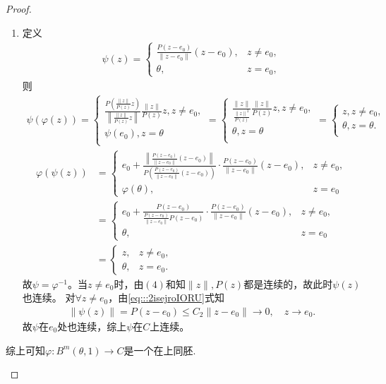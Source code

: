 \documentclass[../../main.tex]{subfiles}%
\begin{document}
\begin{proof}
\begin{enumerate}[(1)]
\begin{enumerate}[(1)]
\item 定义\begin{align*}
\psi(z)=
\begin{cases}
\frac{P(z-e_0)}{\|z-e_0\|}(z-e_0),&z\ne e_0,\\
\theta,&z=e_0,
\end{cases}
\end{align*}
则\begin{align*}
\psi \left( \varphi \left( z \right) \right) =\begin{cases}
\frac{P\left( \frac{\left\| z \right\|}{P\left( z \right)}z \right)}{\left\| \frac{\left\| z \right\|}{P\left( z \right)}z \right\|}\frac{\left\| z \right\|}{P\left( z \right)}z,z\ne e_0,\\
\psi \left( e_0 \right) ,z=\theta\\
\end{cases}=\begin{cases}
\frac{\left\| z \right\|}{\frac{\left\| z \right\| ^2}{P\left( z \right)}}\frac{\left\| z \right\|}{P\left( z \right)}z,z\ne e_0,\\
\theta ,z=\theta\\
\end{cases}=\begin{cases}
z,z\ne e_0,\\
\theta ,z=\theta .\\
\end{cases}
\end{align*}
\begin{align*}
\varphi(\psi(z))&=
\begin{cases}
e_0+\frac{\left\|\frac{P(z-e_0)}{\|z-e_0\|}(z-e_0)\right\|}{P\left(\frac{P(z-e_0)}{\|z-e_0\|}(z-e_0)\right)}\cdot\frac{P(z-e_0)}{\|z-e_0\|}(z-e_0),&z\ne e_0,\\
\varphi(\theta),&z=e_0
\end{cases}\\
&=
\begin{cases}
e_0+\frac{P(z-e_0)}{\frac{P(z-e_0)}{\|z-e_0\|}P(z-e_0)}\cdot\frac{P(z-e_0)}{\|z-e_0\|}(z-e_0),&z\ne e_0,\\
\theta,&z=e_0
\end{cases}\\
&=
\begin{cases}
z,&z\ne e_0,\\
\theta,&z=e_0.
\end{cases}
\end{align*}
故$\psi=\varphi^{-1}$。当$z\ne e_0$时，由$(4)$和知$\|z\|,P(z)$都是连续的，故此时$\psi(z)$也连续。
对$\forall z\ne e_0$，由\eqref{eq:::2isejroIORU}式知\begin{align*}
\|\psi(z)\|=P(z-e_0)\leqslant C_2\|z-e_0\|\rightarrow 0,\quad z\rightarrow e_0.
\end{align*}
故$\psi$在$e_0$处也连续，综上$\psi$在$C$上连续。
\end{enumerate}

综上可知$\varphi: B^m(\theta, 1) \to C$是一个在上同胚.
\end{enumerate}
\end{proof}
\end{document}
